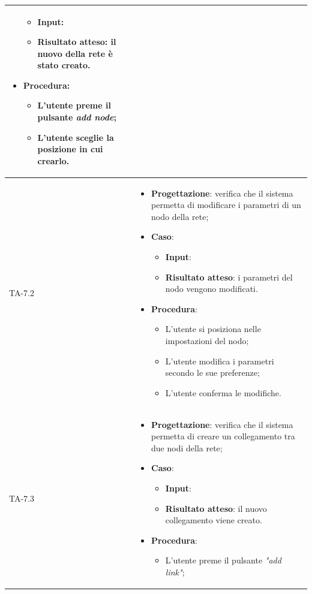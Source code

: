 \begin{longtable}{|C{2.5cm}|C{13cm}|}
\begin{itemize}
\begin{itemize}
		\item \textbf{Input}:
		\item \textbf{Risultato atteso}: il nuovo della rete è stato creato.
	\end{itemize}
	\item \textbf{Procedura}:
	\begin{itemize}
		\item L'utente preme il pulsante \emph{add node};
		\item L'utente sceglie la posizione in cui crearlo.
	\end{itemize} 
\end{itemize} \\
\hline
{TA-7.2} &
\begin{itemize}
	\item \textbf{Progettazione}: verifica che il sistema permetta di modificare i parametri di un nodo della rete;
	\item \textbf{Caso}: 
	\begin{itemize}
		\item \textbf{Input}:
		\item \textbf{Risultato atteso}: i parametri del nodo vengono modificati.
	\end{itemize}
	\item \textbf{Procedura}:
	\begin{itemize}
		\item L'utente si posiziona nelle impostazioni del nodo;
		\item L'utente modifica i parametri secondo le sue preferenze;
		\item L'utente conferma le modifiche.
	\end{itemize} 
\end{itemize} \\
\hline
{TA-7.3} &
\begin{itemize}
	\item \textbf{Progettazione}: verifica che il sistema permetta di creare un collegamento tra due nodi della rete;
	\item \textbf{Caso}: 
	\begin{itemize}
		\item \textbf{Input}: 
		\item \textbf{Risultato atteso}: il nuovo collegamento viene creato.
	\end{itemize}
	\item \textbf{Procedura}:
	\begin{itemize}
		\item L'utente preme il pulsante \emph{"add link"};

\end{itemize}
\end{itemize}
\end{longtable}
